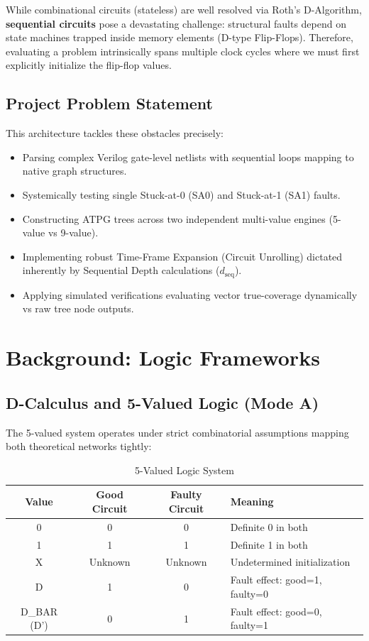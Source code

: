 \documentclass[12pt, a4paper]{article}
\begin{document}
While combinational circuits (stateless) are well resolved via Roth's D-Algorithm, \textbf{sequential circuits} pose a devastating challenge: structural faults depend on state machines trapped inside memory elements (D-type Flip-Flops). Therefore, evaluating a problem intrinsically spans multiple clock cycles where we must first explicitly initialize the flip-flop values.

\subsection{Project Problem Statement}
This architecture tackles these obstacles precisely:
\begin{itemize}
    \item Parsing complex Verilog gate-level netlists with sequential loops mapping to native graph structures.
    \item Systemically testing single Stuck-at-0 (SA0) and Stuck-at-1 (SA1) faults.
    \item Constructing ATPG trees across two independent multi-value engines (5-value vs 9-value).
    \item Implementing robust Time-Frame Expansion (Circuit Unrolling) dictated inherently by Sequential Depth calculations ($d_{\text{seq}}$).
    \item Applying simulated verifications evaluating vector true-coverage dynamically vs raw tree node outputs.
\end{itemize}

\section{Background: Logic Frameworks}

\subsection{D-Calculus and 5-Valued Logic (Mode A)}
The 5-valued system operates under strict combinatorial assumptions mapping both theoretical networks tightly:
\begin{table}[H]
\centering
\caption{5-Valued Logic System}
\begin{tabular}{cccl}
\toprule
\textbf{Value} & \textbf{Good Circuit} & \textbf{Faulty Circuit} & \textbf{Meaning} \\
\midrule
0 & 0 & 0 & Definite 0 in both \\
1 & 1 & 1 & Definite 1 in both \\
X & Unknown & Unknown & Undetermined initialization \\
D & 1 & 0 & Fault effect: good=1, faulty=0 \\
D\_BAR (D')& 0 & 1 & Fault effect: good=0, faulty=1 \\
\bottomrule
\end{tabular}
\end{table}
\end{document}
